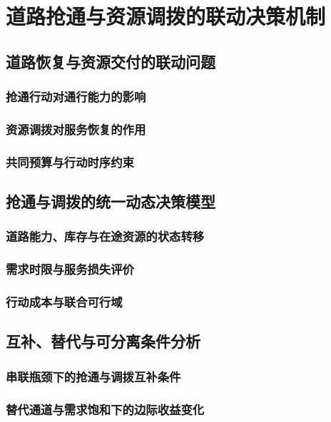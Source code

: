\chapter{道路抢通与资源调拨的联动决策机制}
\label{chap:coordination}

\section{道路恢复与资源交付的联动问题}
\subsection{抢通行动对通行能力的影响}
\subsection{资源调拨对服务恢复的作用}
\subsection{共同预算与行动时序约束}

\ThesisBlank

\section{抢通与调拨的统一动态决策模型}
\subsection{道路能力、库存与在途资源的状态转移}
\subsection{需求时限与服务损失评价}
\subsection{行动成本与联合可行域}

\ThesisBlank

\section{互补、替代与可分离条件分析}
\subsection{串联瓶颈下的抢通与调拨互补条件}
\subsection{替代通道与需求饱和下的边际收益变化}
